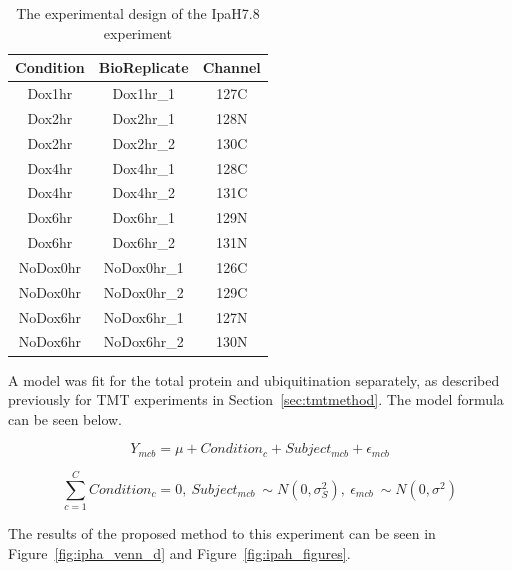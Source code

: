 \documentclass{mcp}
\def\sfigref#1{{Figure~\ref{#1}}}
\begin{document}
\begin{table}[h!]
\centering
\begin{tabular}{| c | c | c |}
\hline
 Condition & BioReplicate & Channel \\ [0.5ex]
 \hline\hline
 Dox1hr & Dox1hr\_1 & 127C\\
 \hline
 Dox2hr & Dox2hr\_1 & 128N\\
\hline
 Dox2hr & Dox2hr\_2 & 130C\\
\hline
 Dox4hr & Dox4hr\_1 & 128C\\
\hline
 Dox4hr & Dox4hr\_2 & 131C\\
\hline
 Dox6hr & Dox6hr\_1 & 129N\\
\hline
 Dox6hr & Dox6hr\_2 & 131N\\
\hline
 NoDox0hr & NoDox0hr\_1 & 126C\\
\hline
 NoDox0hr & NoDox0hr\_2 & 129C\\
\hline
 NoDox6hr & NoDox6hr\_1 & 127N\\
\hline
 NoDox6hr & NoDox6hr\_2 & 130N\\
\hline

\end{tabular}
\caption{The experimental design of the IpaH7.8 experiment}
\label{table:ipah_design}
\end{table}

A model was fit for the total protein and ubiquitination separately, as described previously for TMT experiments in Section~\ref{sec:tmtmethod}. The model formula can be seen below.

$$Y_{mcb} = \mu + Condition_c + Subject_{mcb} + \epsilon_{mcb}$$

$$\sum_{c=1}^C{Condition_c} = 0 ,\: Subject_{mcb} ~ \sim N(0, \sigma^2_S) ,\: \epsilon_{mcb} ~ \sim N(0, \sigma^2)$$

The results of the proposed method to this experiment can be seen in \sfigref{fig:ipha_venn_d} and \sfigref{fig:ipah_figures}.
\end{document}
